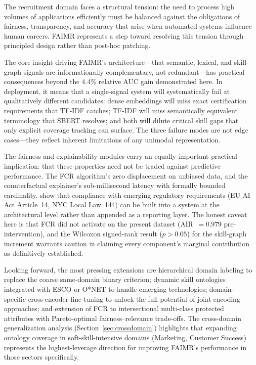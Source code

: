 \documentclass[smallcondensed,numbers]{sn-jnl}
\begin{document}
The recruitment domain faces a structural tension: the need to process high volumes of applications efficiently must be balanced against the obligations of fairness, transparency, and accuracy that arise when automated systems influence human careers. FAIMR represents a step toward resolving this tension through principled design rather than post-hoc patching.

The core insight driving FAIMR's architecture---that semantic, lexical, and skill-graph signals are informationally complementary, not redundant---has practical consequences beyond the 4.4\% relative AUC gain demonstrated here. In deployment, it means that a single-signal system will systematically fail at qualitatively different candidates: dense embeddings will miss exact certification requirements that TF-IDF catches; TF-IDF will miss semantically equivalent terminology that SBERT resolves; and both will dilute critical skill gaps that only explicit coverage tracking can surface. The three failure modes are not edge cases---they reflect inherent limitations of any unimodal representation.

The fairness and explainability modules carry an equally important practical implication: that these properties need not be traded against predictive performance. The FCR algorithm's zero displacement on unbiased data, and the counterfactual explainer's sub-millisecond latency with formally bounded cardinality, show that compliance with emerging regulatory requirements (EU AI Act Article~14, NYC Local Law~144) can be built into a system at the architectural level rather than appended as a reporting layer. The honest caveat here is that FCR did not activate on the present dataset (AIR~$= 0.979$ pre-intervention), and the Wilcoxon signed-rank result ($p > 0.05$) for the skill-graph increment warrants caution in claiming every component's marginal contribution as definitively established.

Looking forward, the most pressing extensions are hierarchical domain labeling to replace the coarse same-domain binary criterion; dynamic skill ontologies integrated with ESCO or O*NET to handle emerging technologies; domain-specific cross-encoder fine-tuning to unlock the full potential of joint-encoding approaches; and extension of FCR to intersectional multi-class protected attributes with Pareto-optimal fairness--relevance trade-offs. The cross-domain generalization analysis (Section~\ref{sec:crossdomain}) highlights that expanding ontology coverage in soft-skill-intensive domains (Marketing, Customer Success) represents the highest-leverage direction for improving FAIMR's performance in those sectors specifically.
\end{document}
